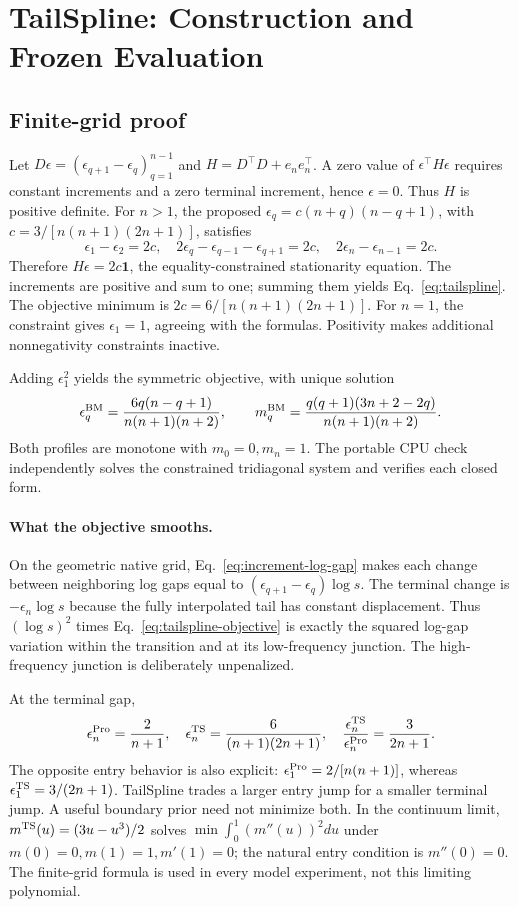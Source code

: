 \section{TailSpline: Construction and Frozen Evaluation}
\label{sec:tailspline-details}
\subsection{Finite-grid proof}
Let $D\epsilon=(\epsilon_{q+1}-\epsilon_q)_{q=1}^{n-1}$ and $H=D^\top D+e_ne_n^\top$. A zero value of $\epsilon^\top H\epsilon$ requires constant increments and a zero terminal increment, hence $\epsilon=0$. Thus $H$ is positive definite. For $n>1$, the proposed $\epsilon_q=c(n+q)(n-q+1)$, with $c=3/[n(n+1)(2n+1)]$, satisfies
\[
\epsilon_1-\epsilon_2=2c,\quad
2\epsilon_q-\epsilon_{q-1}-\epsilon_{q+1}=2c,\quad
2\epsilon_n-\epsilon_{n-1}=2c.
\]
Therefore $H\epsilon=2c\mathbf1$, the equality-constrained stationarity equation. The increments are positive and sum to one; summing them yields Eq.~\eqref{eq:tailspline}. The objective minimum is $2c=6/[n(n+1)(2n+1)]$. For $n=1$, the constraint gives $\epsilon_1=1$, agreeing with the formulas. Positivity makes additional nonnegativity constraints inactive.

Adding $\epsilon_1^2$ yields the symmetric objective, with unique solution
\begin{equation}
\epsilon_q^{\rm BM}=\frac{6q(n-q+1)}{n(n+1)(n+2)},\qquad
m_q^{\rm BM}=\frac{q(q+1)(3n+2-2q)}{n(n+1)(n+2)}.
\label{eq:bm-formula}
\end{equation}
Both profiles are monotone with $m_0=0,m_n=1$. The portable CPU check independently solves the constrained tridiagonal system and verifies each closed form.

\paragraph{What the objective smooths.}
On the geometric native grid, Eq.~\eqref{eq:increment-log-gap} makes each change between neighboring log gaps equal to $(\epsilon_{q+1}-\epsilon_q)\log s$. The terminal change is $-\epsilon_n\log s$ because the fully interpolated tail has constant displacement. Thus $(\log s)^2$ times Eq.~\eqref{eq:tailspline-objective} is exactly the squared log-gap variation within the transition and at its low-frequency junction. The high-frequency junction is deliberately unpenalized.

At the terminal gap,
\[
\epsilon_n^{\rm Pro}=\frac2{n+1},\quad
\epsilon_n^{\rm TS}=\frac6{(n+1)(2n+1)},\quad
\frac{\epsilon_n^{\rm TS}}{\epsilon_n^{\rm Pro}}=\frac3{2n+1}.
\]
The opposite entry behavior is also explicit: $\epsilon_1^{\rm Pro}=2/[n(n+1)]$, whereas $\epsilon_1^{\rm TS}=3/(2n+1)$. TailSpline trades a larger entry jump for a smaller terminal jump. A useful boundary prior need not minimize both. In the continuum limit, $m^{\rm TS}(u)=(3u-u^3)/2$ solves $\min\int_0^1(m''(u))^2du$ under $m(0)=0,m(1)=1,m'(1)=0$; the natural entry condition is $m''(0)=0$. The finite-grid formula is used in every model experiment, not this limiting polynomial.

